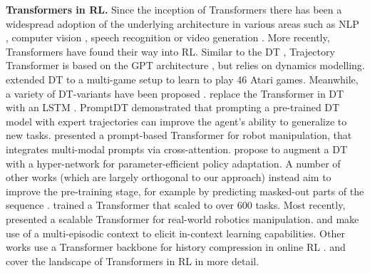 \documentclass{article}
\begin{document}
\textbf{Transformers in RL.} Since the inception of Transformers \citep{Vaswani:17} there has been a widespread adoption of the underlying architecture in various areas such as NLP \citep{Devlin:18,Radford:19,Brown:20}, computer vision \citep{Dosovitskiy:21,He:22,Radford:21,Fürst:21,Ramesh:21,Rombach:22}, speech recognition \citep{Radford:22,Baevski:20} or video generation \citep{Ho:22,Singer:22}. 
More recently, Transformers have found their way into RL. 
Similar to the DT \citet{Chen:21}, Trajectory Transformer \citep{Janner:21} is based on the GPT architecture \citep{Radford:18}, but relies on dynamics modelling. \citet{Lee:22} extended DT to a multi-game setup to learn to play 46 Atari games.
Meanwhile, a variety of DT-variants have been proposed \citep{Zheng:22,Wang_bootstrapped:22,Shang:22,Meng:21}. \citet{Siebenborn:22} replace the Transformer in DT with an LSTM \citep{Hochreiter:97}. 
PromptDT \citep{Xu:22} demonstrated that prompting a pre-trained DT model with expert trajectories can improve the agent's ability to generalize to new tasks. 
\citet{Jiang:22} presented a prompt-based Transformer for robot manipulation, that integrates multi-modal prompts via cross-attention. \citet{XuMengdi:22} propose to augment a DT with a hyper-network for parameter-efficient policy adaptation.
A number of other works (which are largely orthogonal to our approach) instead aim to improve the pre-training stage, for example by predicting masked-out parts of the sequence \citep{Carroll:22,LiuFangchen:22,Sun:22}. 
\citet{Reed:22} trained a Transformer that scaled to over 600 tasks. 
Most recently, \citet{Brohan:22} presented a scalable Transformer for real-world robotics manipulation.
\citet{Laskin:22} and \citet{Liu:23} make use of a multi-episodic context to elicit in-context learning capabilities.
Other works use a Transformer backbone for history compression in online RL \citep{Parisotto:20,Paischer:22,Paischer:23}.
\citet{Li:23} and \citet{Yang:23} cover the landscape of Transformers in RL in more detail.
\end{document}
